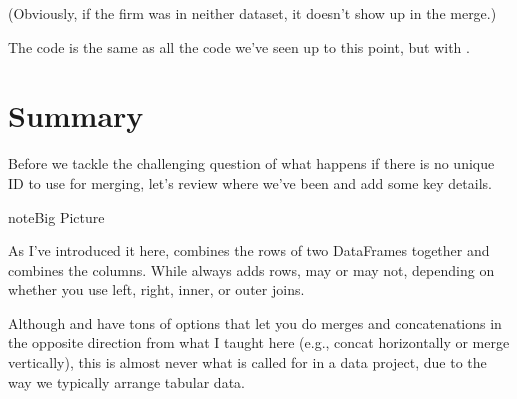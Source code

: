 \documentclass[letterpaper,10pt,english]{sphinxmanual}
\begin{document}
(Obviously, if the firm was in neither dataset, it doesn’t show up in the merge.)

The code is the same as all the code we’ve seen up to this point, but with .

\begin{sphinxVerbatim}[commandchars=\\\{\}]
       
\end{sphinxVerbatim}


\section{Summary}
\label{\detokenize{chapter-12-concat-and-merge:summary}}
Before we tackle the challenging question of what happens if there is no unique ID to use for merging, let’s review where we’ve been and add some key details.

\begin{sphinxadmonition}{note}{Big Picture}

As I’ve introduced it here,  combines the rows of two DataFrames together and  combines the columns.  While  always adds rows,  may or may not, depending on whether you use left, right, inner, or outer joins.

Although  and  have tons of options that let you do merges and concatenations in the opposite direction from what I taught here (e.g., concat horizontally or merge vertically), this is almost never what is called for in a data project, due to the way we typically arrange tabular data.
\end{sphinxadmonition}
\end{document}
